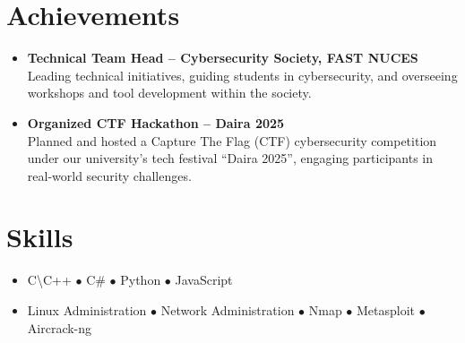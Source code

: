\documentclass[a4paper,12pt]{article}
\begin{document}
\section{Achievements}
\begin{itemize}[leftmargin=20pt, labelsep=5pt, itemsep=2pt, topsep=2pt]
\item \textbf{Technical Team Head – Cybersecurity Society, FAST NUCES}\\
Leading technical initiatives, guiding students in cybersecurity, and overseeing workshops and tool development within the society. \\[2pt]

\item \textbf{Organized CTF Hackathon – Daira 2025}\\
Planned and hosted a Capture The Flag (CTF) cybersecurity competition under our university’s tech festival “Daira 2025”, engaging participants in real-world security challenges.
\end{itemize}
\section{Skills}
\begin{itemize}[leftmargin=20pt, labelsep=5pt, itemsep=2pt, topsep=2pt]
\item C\textbackslash C++ \hspace{10pt} $\bullet$ C\# \hspace{10pt} $\bullet$ Python \hspace{10pt} $\bullet$ JavaScript


\item Linux Administration \hspace{10pt} $\bullet$ Network Administration \hspace{10pt} $\bullet$ Nmap \hspace{10pt} $\bullet$ Metasploit \hspace{10pt} $\bullet$ Aircrack-ng
\end{itemize}
 
\end{document}

